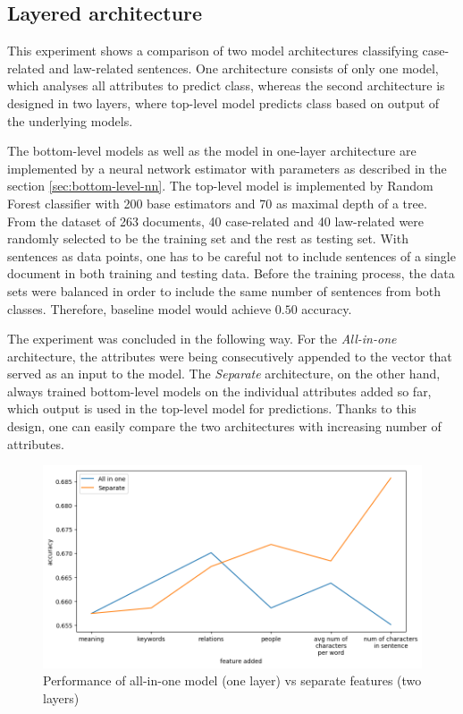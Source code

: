 \documentclass[
  digital, %
  notable,   %
  nolof,     %
  nolot,     %
]{fithesis3}
\begin{document}
\subsection{Layered architecture}
\label{eval:allinone-vs-features}
This experiment shows a comparison of two model architectures classifying case-related and law-related sentences.
One architecture consists of only one model, which analyses all attributes to predict class, whereas the second architecture is designed in two layers, where top-level model predicts class based on output of the underlying models.

The bottom-level models as well as the model in one-layer architecture are implemented by a neural network estimator with parameters as described in the section \ref{sec:bottom-level-nn}.
The top-level model is implemented by Random Forest classifier with 200 base estimators and 70 as maximal depth of a tree.
From the dataset of 263 documents, 40 case-related and 40 law-related were randomly selected to be the training set and the rest as testing set.
With sentences as data points, one has to be careful not to include sentences of a single document in both training and testing data.
Before the training process, the data sets were balanced in order to include the same number of sentences from both classes.
Therefore, baseline model would achieve $0.50$ accuracy.

The experiment was concluded in the following way.
For the \textit{All-in-one} architecture, the attributes were being consecutively appended to the vector that served as an input to the model.
The \textit{Separate} architecture, on the other hand, always trained bottom-level models on the individual attributes added so far, which output is used in the top-level model for predictions.
Thanks to this design, one can easily compare the two architectures with increasing number of attributes.

\begin{figure}[H]
\caption{Performance of all-in-one model (one layer) vs separate features (two layers)}
\label{fig:eval_all-in-one}
\includegraphics[width=\textwidth]{img/eval_all-in-one}
\end{figure}
\end{document}
